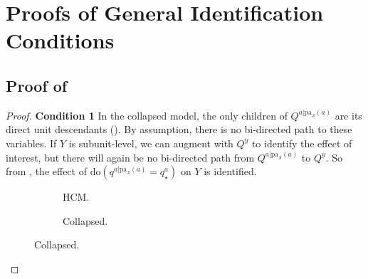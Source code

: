 \documentclass[12pt]{article}
\newcommand{\Sc}{\mathcal{S}}
\newcommand{\rmdo}{\mathrm{do}}
\newcommand{\pa}{\mathrm{pa}}
\begin{document}
	 \section{Proofs of General Identification Conditions}

\subsection{Proof of } \label{proof:sufficient_ID}

\begin{proof}
\textbf{Condition 1} In the collapsed model, the only children of $Q^{a|\pa_\Sc(a)}$ are its direct unit descendants (). By assumption, there is no bi-directed path to these variables. 
If $Y$ is subunit-level, we can augment with $Q^y$ to identify the effect of interest, but there will again be no bi-directed path from $Q^{a|\pa_\Sc(a)}$ to $Q^y$. 
So from , the effect of $\rmdo(q^{a|\pa_\Sc(a)}=q_\star^a)$ on $Y$ is identified.




\begin{figure}[t]

\begin{subfigure}[t]{0.2\textwidth}
\caption{HCM.} \label{fig:gen_iv_hcm}
\centering
{}
\end{subfigure}
\begin{subfigure}[t]{0.24\textwidth}
\caption{Collapsed.} \label{fig:gen_iv_collapse}
\centering
{}
\end{subfigure}
\end{figure}
\end{proof}
\end{document}
